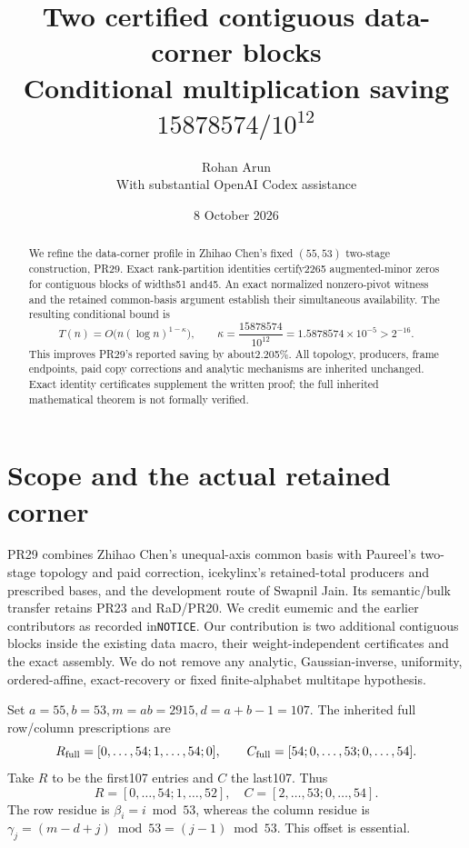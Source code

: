\documentclass[11pt]{article}
\title{Two certified contiguous data-corner blocks\\\large Conditional multiplication saving $15878574/10^{12}$}
\author{Rohan Arun\\\small With substantial OpenAI Codex assistance}
\date{8 October 2026}
\begin{document}
\maketitle
\begin{abstract}
We refine the data-corner profile in Zhihao Chen's fixed $(55,53)$ two-stage construction, PR29. Exact rank-partition identities certify2265 augmented-minor zeros for contiguous blocks of widths51 and45. An exact normalized nonzero-pivot witness and the retained common-basis argument establish their simultaneous availability. The resulting conditional bound is
\[
T(n)=O\bigl(n(\log n)^{1-\kappa}\bigr),\qquad
\kappa=\frac{15878574}{10^{12}}=1.5878574\times10^{-5}>2^{-16}.
\]
This improves PR29's reported saving by about2.205\%. All topology, producers, frame endpoints, paid copy corrections and analytic mechanisms are inherited unchanged. Exact identity certificates supplement the written proof; the full inherited mathematical theorem is not formally verified.
\end{abstract}

\section{Scope and the actual retained corner}
PR29 combines Zhihao Chen's unequal-axis common basis with Paureel's two-stage topology and paid correction, icekylinx's retained-total producers and prescribed bases, and the development route of Swapnil Jain. Its semantic/bulk transfer retains PR23 and RaD/PR20. We credit eumemic and the earlier contributors as recorded in\texttt{NOTICE}. Our contribution is two additional contiguous blocks inside the existing data macro, their weight-independent certificates and the exact assembly. We do not remove any analytic, Gaussian-inverse, uniformity, ordered-affine, exact-recovery or fixed finite-alphabet multitape hypothesis.

Set $a=55,b=53,m=ab=2915,d=a+b-1=107$. The inherited full row/column prescriptions are
\[
R_{\rm full}=[0,\ldots,54;1,\ldots,54;0],\qquad
C_{\rm full}=[54;0,\ldots,53;0,\ldots,54].
\]
Take $R$ to be the first107 entries and $C$ the last107. Thus
\[
R=[0,\ldots,54;1,\ldots,52],\quad C=[2,\ldots,53;0,\ldots,54].
\]
The row residue is $\beta_i=i\bmod53$, whereas the column residue is $\gamma_j=(m-d+j)\bmod53=(j-1)\bmod53$. This offset is essential.
\end{document}
